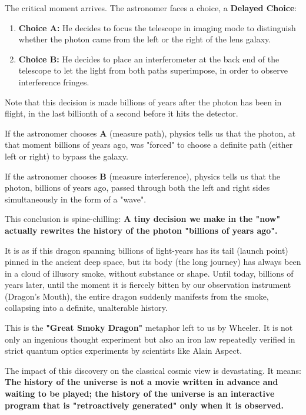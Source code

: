 The critical moment arrives. The astronomer faces a choice, a \textbf{Delayed Choice}:

\begin{enumerate}
\item \textbf{Choice A:} He decides to focus the telescope in imaging mode to distinguish whether the photon came from the left or the right of the lens galaxy.
\item \textbf{Choice B:} He decides to place an interferometer at the back end of the telescope to let the light from both paths superimpose, in order to observe interference fringes.
\end{enumerate}

Note that this decision is made billions of years after the photon has been in flight, in the last billionth of a second before it hits the detector.

If the astronomer chooses \textbf{A} (measure path), physics tells us that the photon, at that moment billions of years ago, was "forced" to choose a definite path (either left or right) to bypass the galaxy.

If the astronomer chooses \textbf{B} (measure interference), physics tells us that the photon, billions of years ago, passed through both the left and right sides simultaneously in the form of a "wave".

This conclusion is spine-chilling: \textbf{A tiny decision we make in the "now" actually rewrites the history of the photon "billions of years ago".}

It is as if this dragon spanning billions of light-years has its tail (launch point) pinned in the ancient deep space, but its body (the long journey) has always been in a cloud of illusory smoke, without substance or shape. Until today, billions of years later, until the moment it is fiercely bitten by our observation instrument (Dragon's Mouth), the entire dragon suddenly manifests from the smoke, collapsing into a definite, unalterable history.

This is the \textbf{"Great Smoky Dragon"} metaphor left to us by Wheeler. It is not only an ingenious thought experiment but also an iron law repeatedly verified in strict quantum optics experiments by scientists like Alain Aspect.

The impact of this discovery on the classical cosmic view is devastating. It means: \textbf{The history of the universe is not a movie written in advance and waiting to be played; the history of the universe is an interactive program that is "retroactively generated" only when it is observed.}

